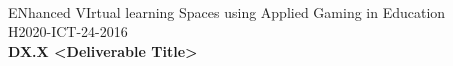 \documentclass[12pt]{article}
\begin{document}
\begin{titlepage}
\\
\vspace{0.5cm}
{\fontsize{18pt}{22pt}\selectfont ENhanced VIrtual learning Spaces using Applied Gaming in Education}\\
\vspace{0.5cm}
{\fontsize{14pt}{18pt}\selectfont H2020-ICT-24-2016}\\
\vspace{0.5cm}
{\fontsize{20pt}{24pt}\selectfont\textbf{DX.X <Deliverable Title>}}\\


\end{titlepage}
\end{document}
